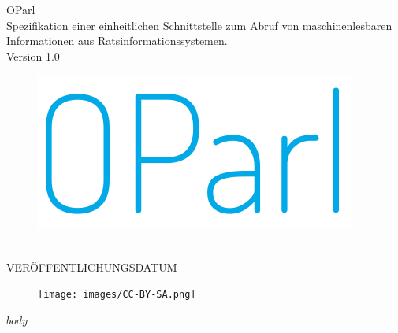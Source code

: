 \documentclass[$if(fontsize)$$fontsize$,$endif$$if(lang)$$lang$,$endif$,a4paper]{$documentclass$}
\makeatletter
\def\maxwidth{\ifdim\Gin@nat@width>\linewidth\linewidth
\else\Gin@nat@width\fi}
\let\Oldincludegraphics\includegraphics
\renewcommand{\includegraphics}[1]{\Oldincludegraphics[width=\maxwidth]{#1}}
\makeatother
\begin{document}
\begin{titlepage}
  \centering
  \vspace*{0em}
  \Huge{OParl} \\
  \vspace{2em}
  \Large{Spezifikation einer einheitlichen Schnittstelle zum Abruf von maschinenlesbaren Informationen aus Ratsinformationssystemen.} \\
  \Large{Version 1.0}
  \vspace{5em}
  \begin{figure}[htbp]
    \centering
    \includegraphics{../resources/titelbild.png}
  \end{figure}
  \vspace{8em} \\
  \Large{VERÖFFENTLICHUNGSDATUM}\\
  \vspace{2em}
  \begin{figure}[htbp]
    \centering
    \texttt{[image: images/CC-BY-SA.png]}
  \end{figure}
\end{titlepage}

\clearpage

\hypersetup{linkcolor=blue}
\tableofcontents
\clearpage

$body$
\end{document}
